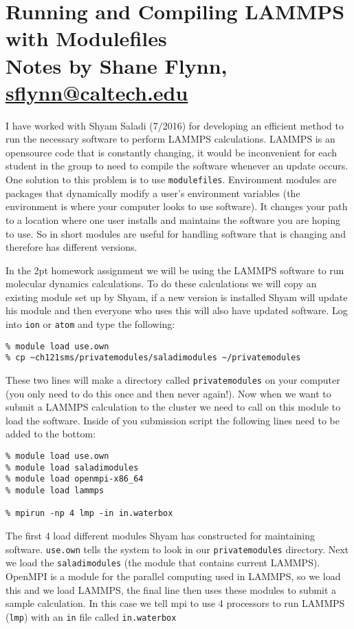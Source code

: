 \documentclass{article}
\author{
	Shane Flynn\\
	\texttt{sflynn@caltech.edu}
}
\begin{document}
\section*{Running and Compiling LAMMPS with Modulefiles \\ Notes by Shane Flynn, \url{sflynn@caltech.edu}}
I have worked with Shyam Saladi (7/2016) for developing an efficient method to run the necessary software to perform LAMMPS calculations.
LAMMPS is an opensource code that is constantly changing, it would be inconvenient for each student in the group to need to compile the software whenever an update occurs.
One solution to this problem is to use \texttt{modulefiles}.
Environment modules are packages that dynamically modify a user's environment variables (the environment is where your computer looks to use software).
It changes your path to a location where one user installs and maintains the software you are hoping to use.
So in short modules are useful for handling software that is changing and therefore has different versions.

In the 2pt homework assignment we will be using the LAMMPS software to run molecular dynamics calculations.
To do these calculations we will copy an existing module set up by Shyam, if a new version is installed Shyam will update his module and then everyone who uses this will also have updated software.
Log into \texttt{ion} or \texttt{atom} and type the following:

\begin{lstlisting}
% module load use.own
% cp ~ch121sms/privatemodules/saladimodules ~/privatemodules
\end{lstlisting}

These two lines will make a directory called \texttt{privatemodules} on your computer (you only need to do this once and then never again!).
Now when we want to submit a LAMMPS calculation to the cluster we need to call on this module to load the software.
Inside of you submission script the following lines need to be added to the bottom:

\begin{lstlisting}
% module load use.own
% module load saladimodules
% module load openmpi-x86_64
% module load lammps

% mpirun -np 4 lmp -in in.waterbox
\end{lstlisting}

The first 4 load different modules Shyam has constructed for maintaining software.
\texttt{use.own} tells the system to look in our \texttt{privatemodules} directory.
Next we load the \texttt{saladimodules} (the module that contains current LAMMPS).
OpenMPI is a module for the parallel computing used in LAMMPS, so we load this and we load LAMMPS, the final line then uses these modules to submit a sample calculation.
In this case we tell mpi to use 4 processors to run LAMMPS (\texttt{lmp}) with an \texttt{in} file called \texttt{in.waterbox}
\end{document}
